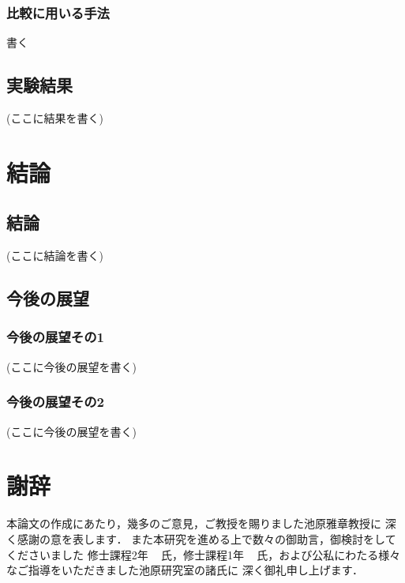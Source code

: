 \documentclass[dvipdfmx,disablejfam,nosetpagesize,12pt]{jsbook}
\begin{document}
\subsection{比較に用いる手法}
書く

\section{実験結果}
(ここに結果を書く)

\chapter{結論}
\section{結論}
(ここに結論を書く)

\section{今後の展望}
\subsection{今後の展望その1}
(ここに今後の展望を書く)

\subsection{今後の展望その2}
(ここに今後の展望を書く)

\chapter*{謝辞}
本論文の作成にあたり，幾多のご意見，ご教授を賜りました池原雅章教授に
深く感謝の意を表します．
また本研究を進める上で数々の御助言，御検討をしてくださいました
修士課程2年
\textbigcircle\,\textbigcircle\,\textbigcircle\,\textbigcircle
氏，修士課程1年
\textbigcircle\,\textbigcircle\,\textbigcircle\,\textbigcircle
氏，および公私にわたる様々なご指導をいただきました池原研究室の諸氏に
深く御礼申し上げます．


%

\end{document}
